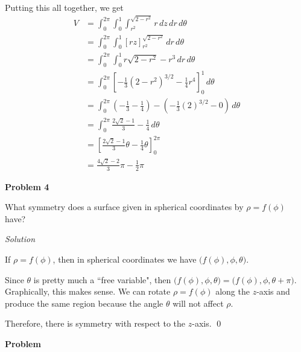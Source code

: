 \documentclass{article}
\newcommand{\lrp}[1]{\left( #1 \right)}
\newcommand{\lrb}[1]{\left[ #1 \right]}
\newcommand{\Solution}{\textit{Solution}}
\begin{document}
Putting this all together, we get
\begin{align*}
    V&=\int_0^{2\pi}\int_0^1\int_{r^2}^{\sqrt{2-r^2}}r\,dz\,dr\,d\theta\\
    &=\int_0^{2\pi}\int_0^1\lrb{rz}_{r^2}^{\sqrt{2-r^2}}\,dr\,d\theta\\
    &=\int_0^{2\pi}\int_0^1 r\sqrt{2-r^2}-r^3\,dr\,d\theta\\
    &=\int_0^{2\pi}\lrb{-\frac{1}{3}(2-r^2)^{3/2}-\frac{1}{4}r^4}_0^1\,d\theta\tag{you can also do a $u$ sub}\\
    &=\int_0^{2\pi} \lrp{-\frac{1}{3}-\frac{1}{4}}-\lrp{-\frac{1}{3}(2)^{3/2}-0}\,d\theta\\
    &=\int_0^{2\pi} \frac{2\sqrt{2}-1}{3}-\frac{1}{4}\,d\theta\\
    &=\lrb{\frac{2\sqrt{2}-1}{3}\theta -\frac{1}{4}\theta}_0^{2\pi}\\
    &=\boxed{\frac{4\sqrt{2}-2}{3}\pi-\frac{1}{2}\pi}
\end{align*}
{}\textbf{Problem 4} 

What symmetry does a surface given in spherical coordinates by $\rho =f(\phi)$ have?

\Solution

If $\rho=f(\phi)$, then in spherical coordinates we have $\big(f(\phi),\phi,\theta)$. 

Since $\theta$ is pretty much a ``free variable", then $\big(f(\phi),\phi,\theta)=\big(f(\phi),\phi,\theta+\pi)$. Graphically, this makes sense. We can rotate $\rho = f(\phi)$ along the $z$-axis and produce the same region because the angle $\theta$ will not affect $\rho$.

Therefore, there is symmetry with respect to the $z$-axis.
\qed

\textbf{Problem}
\end{document}
